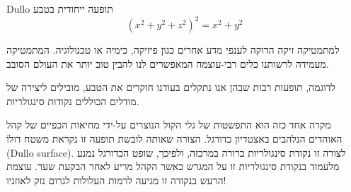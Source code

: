 %
\begin{surferPage}[Dullo]{\textenglish{Dullo}}
תופעה ייחודית בטבע
\smallskip
\[(x^2+ y^2+ z^2)^2	= x^2+ y^2\]

למתמטיקה זיקה הדוקה לענפי מדע אחרים כגון פיזיקה, כימיה או טכנולוגיה. המתמטיקה מעמידה לרשותנו כלים רבי-עוצמה המאפשרים לנו להבין טוב יותר את העולם הסובב. 

לדוגמה, תופעות רבות שבהן אנו נתקלים בעודנו חוקרים את הטבע, מובילים ליצירה של מודלים הכוללים נקודות סינגולריות.

מקרה אחד כזה הוא התפשטות של גלי הקול הנוצרים על-ידי מחיאות הכפיים של קהל האוהדים הנלהבים באצטדיון כדורגל. הצורה שאותה לובשת תופעה זו נקראת משטח דוּלוֹ 
\textenglish{(Dullo surface)}. לצורה זו נקודת סינגולריות ברורה במרכזה, ולפיכך, שופט הכדורגל נמנע מלעמוד בנקודת סינגולריות זו על המגרש כאשר הקהל מריע לאחר הבקעת שער. עוצמת הרעש בנקודה זו מגיעה לרמות העלולות לגרום נזק לאוזניו!
\end{surferPage}
